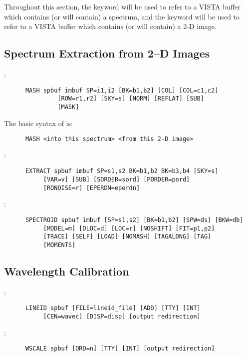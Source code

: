 Throughout this section, the keyword  will be used to refer to a
VISTA buffer which contains (or will contain) a spectrum, and the keyword
 will be used to refer to a VISTA buffer which contains (or will
contain) a 2-D image.

\subsection{Spectrum Extraction from 2--D Images}

:
\begin{verbatim}
      MASH spbuf imbuf SP=i1,i2 [BK=b1,b2] [COL] [COL=c1,c2]
		       [ROW=r1,r2] [SKY=s] [NORM] [REFLAT] [SUB]
		       [MASK]
\end{verbatim}
The basic syntax of  is:
\begin{verbatim}
      MASH <into this spectrum> <from this 2-D image>
\end{verbatim}

\noindent {}:
\begin{verbatim}
      EXTRACT spbuf imbuf SP=s1,s2 BK=b1,b2 BK=b3,b4 [SKY=s]
		   [VAR=v] [SUB] [SORDER=sord] [PORDER=pord]
		   [RONOISE=r] [EPERDN=eperdn]
\end{verbatim}

\noindent {}:
\begin{verbatim}
      SPECTROID spbuf imbuf [SP=s1,s2] [BK=b1,b2] [SPW=ds] [BKW=db]
		   [MODEL=m] [DLOC=d] [LOC=r] [NOSHIFT] [FIT=p1,p2]
		   [TRACE] [SELF] [LOAD] [NOMASH] [TAGALONG] [TAG]
		   [MOMENTS]
\end{verbatim}

\subsection{Wavelength Calibration}

:
\begin{verbatim}
      LINEID spbuf [FILE=lineid_file] [ADD] [TTY] [INT]
		   [CEN=wavec] [DISP=disp] [output redirection]
\end{verbatim}

\noindent {}:
\begin{verbatim}
      WSCALE spbuf [ORD=n] [TTY] [INT] [output redirection]
\end{verbatim}


